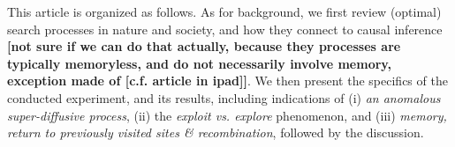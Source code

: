 This article is organized as follows. As for background, we first review (optimal) search processes in nature and society, and how they connect to causal inference {\bf [not sure if we can do that actually, because they processes are typically memoryless, and do not necessarily involve memory, exception made of [c.f. article in ipad]]}. We then present the specifics of the conducted experiment, and its results, including indications of (i) {\it an anomalous super-diffusive process},  (ii) the {\it exploit vs. explore} phenomenon, and (iii) {\it memory, return to previously visited sites \& recombination}, followed by the discussion. 





